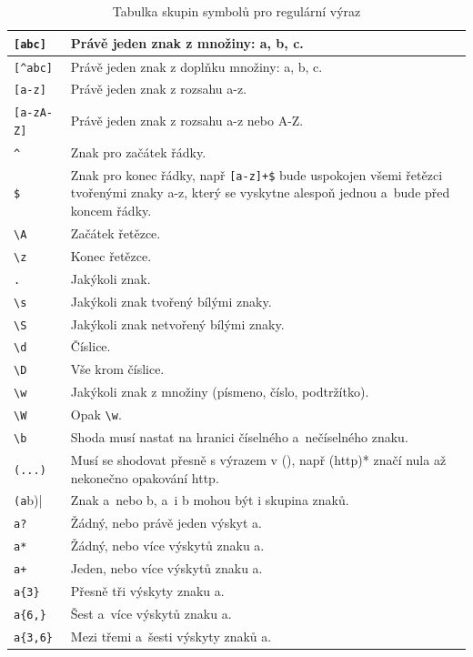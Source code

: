 \begin{table}[h!]
\centering
\begin{tabular}{| m{} | m{} |}
\hline
\verb|[abc]| & Právě jeden znak z množiny: a, b, c. \\
\hline
\verb|[^abc]| & Právě jeden znak z doplňku množiny: a, b, c. \\
\hline
\verb|[a-z]| & Právě jeden znak z rozsahu a-z. \\
\hline
\verb|[a-zA-Z]| & Právě jeden znak z rozsahu a-z nebo A-Z. \\
\hline
\verb|^| & Znak pro začátek řádky. \\
\hline
\verb|$| & Znak pro konec řádky, např \verb|[a-z]+$| bude uspokojen všemi řetězci tvořenými znaky a-z, který se vyskytne alespoň jednou a~bude před koncem řádky. \\
\hline
\verb|\A| & Začátek řetězce. \\
\hline
\verb|\z| & Konec řetězce. \\
\hline
\verb|.| & Jakýkoli znak. \\
\hline
\verb|\s| & Jakýkoli znak tvořený bílými znaky. \\
\hline
\verb|\S| & Jakýkoli znak netvořený bílými znaky. \\
\hline
\verb|\d| & Číslice. \\
\hline
\verb|\D| & Vše krom číslice. \\
\hline
\verb|\w| & Jakýkoli znak z množiny (písmeno, číslo, podtržítko). \\
\hline
\verb|\W| & Opak \verb|\w|. \\
\hline
\verb|\b| & Shoda musí nastat na hranici číselného a~nečíselného znaku. \\
\hline
\verb|(...)| & Musí se shodovat přesně s výrazem v (), např (http)* značí nula až nekonečno opakování http. \\
\hline
\verb|(a|b)| & Znak a~nebo b, a~i b mohou být i skupina znaků. \\
\hline
\verb|a?| & Žádný, nebo právě jeden výskyt a. \\
\hline
\verb|a*| & Žádný, nebo více výskytů znaku a. \\
\hline
\verb|a+| & Jeden, nebo více výskytů znaku a. \\
\hline
\verb|a{3}| & Přesně tři výskyty znaku a. \\
\hline
\verb|a{6,}| & Šest a~více výskytů znaku a. \\
\hline
\verb|a{3,6}| & Mezi třemi a~šesti výskyty znaků a. \\
\hline
\end{tabular}
\caption[Tabulka skupin symbolů pro regulární výraz]{Tabulka skupin symbolů pro regulární výraz}\label{tab:regexpr}
\end{table}

